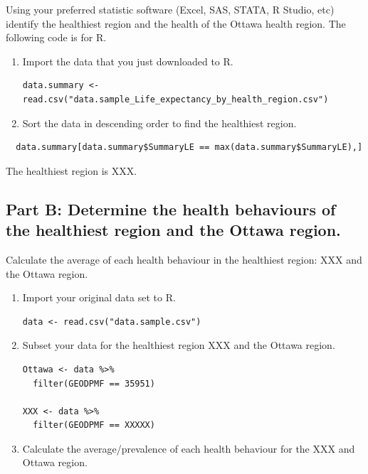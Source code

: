 \documentclass[]{book}
\begin{document}
Using your preferred statistic software (Excel, SAS, STATA, R Studio,
etc) identify the healthiest region and the health of the Ottawa health
region. The following code is for R.

\begin{enumerate}
\def\labelenumi{\arabic{enumi}.}
\setcounter{enumi}{6}
\item
  Import the data that you just downloaded to R.

\begin{verbatim}
data.summary <- read.csv("data.sample_Life_expectancy_by_health_region.csv")
\end{verbatim}
\item
  Sort the data in descending order to find the healthiest region.
\end{enumerate}

\begin{verbatim}
  data.summary[data.summary$SummaryLE == max(data.summary$SummaryLE),]
\end{verbatim}

The healthiest region is XXX.

\subsection{Part B: Determine the health behaviours of the healthiest
region and the Ottawa
region.}\label{part-b-determine-the-health-behaviours-of-the-healthiest-region-and-the-ottawa-region.}

Calculate the average of each health behaviour in the healthiest region:
XXX and the Ottawa region.

\begin{enumerate}
\def\labelenumi{\arabic{enumi}.}
\item
  Import your original data set to R.

\begin{verbatim}
data <- read.csv("data.sample.csv")
\end{verbatim}
\item
  Subset your data for the healthiest region XXX and the Ottawa region.

\begin{verbatim}
Ottawa <- data %>%
  filter(GEODPMF == 35951)

XXX <- data %>%
  filter(GEODPMF == XXXXX)
\end{verbatim}
\item
  Calculate the average/prevalence of each health behaviour for the XXX
  and Ottawa region.
\end{enumerate}
\end{document}
